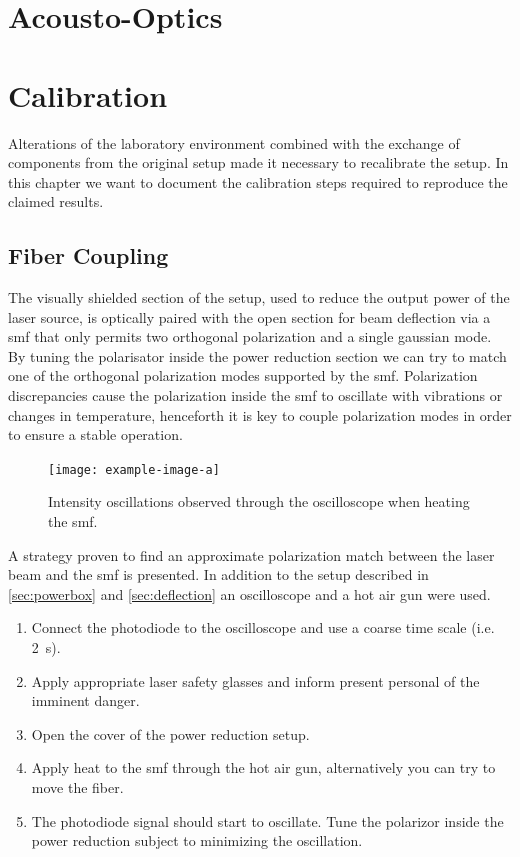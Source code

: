 \section{Acousto-Optics}

\section{Calibration}

Alterations of the laboratory environment combined with the exchange of
components from the original setup made it necessary to recalibrate the setup.
In this chapter we want to document the calibration steps required to
reproduce the claimed results.

\subsection{Fiber Coupling}

The visually shielded section of the setup, used to reduce the output power
of the laser source, is optically paired with the open section for beam
deflection via a \gls{smf} that only permits two orthogonal polarization and
a single gaussian mode. By tuning the polarisator inside the power
reduction section we can try to match one of the orthogonal polarization
modes supported by the \gls{smf}. Polarization discrepancies cause the
polarization inside the \gls{smf} to oscillate with vibrations or changes in
temperature, henceforth it is key to couple polarization modes in order to
ensure a stable operation.

\begin{figure}[ht]
  \centering
  \texttt{[image: example-image-a]}
  \caption{Intensity oscillations observed through the oscilloscope when
  heating the \gls{smf}.}
  \label{fig:fibercoup}
\end{figure}

A strategy proven to find an approximate polarization match between the
laser beam and the \gls{smf} is presented. In addition to the setup described
in \cref{sec:powerbox} and \cref{sec:deflection} an oscilloscope and a hot
air gun were used.

\begin{enumerate}
  \item Connect the photodiode to the oscilloscope and use a coarse time
    scale (i.e. \SI{2}{\second}).
  \item Apply appropriate laser safety glasses and inform present personal
    of the imminent danger.
  \item Open the cover of the power reduction setup.
  \item Apply heat to the \gls{smf} through the hot air gun, alternatively
    you can try to move the fiber.
  \item The photodiode signal should start to oscillate. Tune the polarizor
    inside the power reduction subject to minimizing the oscillation.
\end{enumerate}

